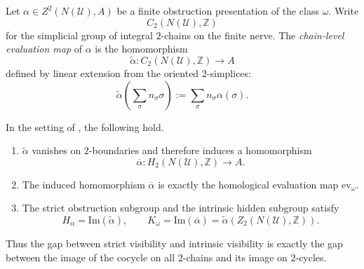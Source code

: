 \begin{definition}\label{def:chain-level-evaluation}
Let $\alpha\in Z^2(N(\mathcal U),A)$ be a finite obstruction presentation of the class $\omega$. Write
\[
C_2(N(\mathcal U),\mathbb Z)
\]
for the simplicial group of integral $2$-chains on the finite nerve. The \emph{chain-level evaluation map} of $\alpha$ is the homomorphism
\[
\widetilde\alpha:C_2(N(\mathcal U),\mathbb Z)\to A
\]
defined by linear extension from the oriented $2$-simplices:
\[
\widetilde\alpha\!\left(\sum_{\sigma} n_{\sigma}\sigma\right)
:=
\sum_{\sigma} n_{\sigma}\alpha(\sigma).
\]
\end{definition}

\begin{proposition}\label{prop:chain-vs-homological-visibility}
In the setting of , the following hold.
\begin{enumerate}[label=(\roman*),nosep]
\item $\widetilde\alpha$ vanishes on $2$-boundaries and therefore induces a homomorphism
\[
\overline\alpha:H_2(N(\mathcal U),\mathbb Z)\to A.
\]
\item The induced homomorphism $\overline\alpha$ is exactly the homological evaluation map $\mathrm{ev}_{\omega}$.
\item The strict obstruction subgroup and the intrinsic hidden subgroup satisfy
\[
H_\alpha=\mathrm{Im}(\widetilde\alpha),
\qquad
K_{\omega}=\mathrm{Im}(\overline\alpha)=\widetilde\alpha(Z_2(N(\mathcal U),\mathbb Z)).
\]
\end{enumerate}
Thus the gap between strict visibility and intrinsic visibility is exactly the gap between the image of the cocycle on all $2$-chains and its image on $2$-cycles.
\end{proposition}

